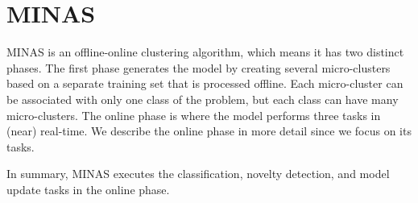 \section{MINAS}
\label{sec:minas}


MINAS is an offline-online clustering algorithm, which means it has two distinct phases.
The first phase generates the model by creating several micro-clusters based
on a separate training set that is processed offline.
Each micro-cluster can be associated with only one class of the problem,
but each class can have many micro-clusters.
The online phase is where the model performs three tasks in (near) real-time.
We describe the online phase in more detail since we focus on its tasks. 

In summary, MINAS executes the classification, novelty detection,
and model update tasks in the online phase.

